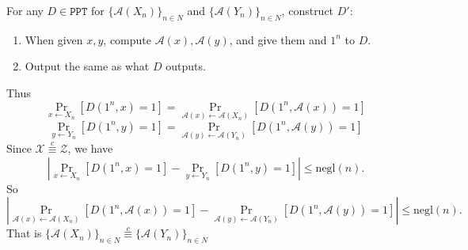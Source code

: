 \documentclass[a4paper]{article}
\newcommand{\negl}{\text{negl}}
\newcommand{\A}{\mathcal{A}}
\newenvironment{problem}[2][Problem]{\begin{trivlist}
\item[\hskip \labelsep {\bfseries #1}\hskip \labelsep {\bfseries #2.}]}{\end{trivlist}}
\begin{document}
\begin{problem}{7.22}
For any $D\in\texttt{PPT}$ for $\{\A(X_n)\}_{n\in N}$ and $\{\A(Y_n)\}_{n\in N}$, construct $D'$:
\begin{enumerate}
    \item When given $x,y$, compute $\A(x),\A(y)$, and give them and $1^n$ to $D$.
    \item Output the same as what $D$ outputs.
\end{enumerate}
Thus \[ \Pr_{x\leftarrow X_n}[D(1^n,x)=1]=\Pr_{\A(x)\leftarrow \A(X_n)}[D(1^n,\A(x))=1] \]\[ \Pr_{y\leftarrow Y_n}[D(1^n,y)=1]=\Pr_{\A(y)\leftarrow \A(Y_n)}[D(1^n,\A(y))=1] \]
Since $\mathcal{X}\overset{c}{\equiv}\mathcal{Z}$, we have \[\left|\Pr_{x\leftarrow X_n}[D(1^n,x)=1]-\Pr_{y\leftarrow Y_n}[D(1^n,y)=1]\right|\le\negl(n).\] So \[\left|\Pr_{\A(x)\leftarrow \A(X_n)}[D(1^n,\A(x))=1]-\Pr_{\A(y)\leftarrow \A(Y_n)}[D(1^n,\A(y))=1]\right|\le\negl(n).\]
That is $\{\A(X_n)\}_{n\in N}\overset{c}{\equiv}\{\A(Y_n)\}_{n\in N}$
\end{problem}
\end{document}

